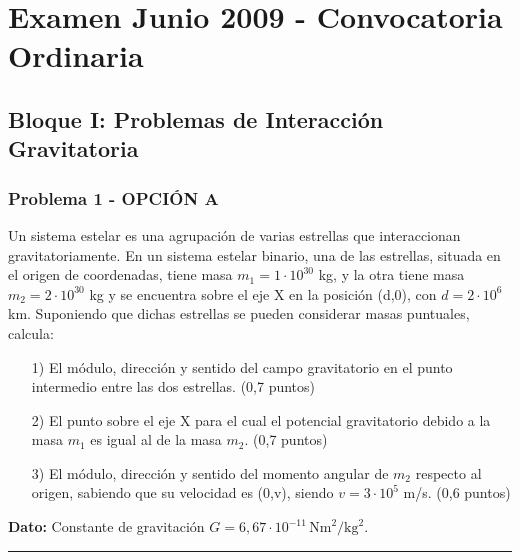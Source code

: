 \chapter{Examen Junio 2009 - Convocatoria Ordinaria}
\label{chap:2009_jun_ord}

\section{Bloque I: Problemas de Interacción Gravitatoria}
\label{sec:grav_2009_jun_ord}

\subsection{Problema 1 - OPCIÓN A}
\label{subsec:1A_2009_jun_ord}

\begin{cajaenunciado}
Un sistema estelar es una agrupación de varias estrellas que interaccionan gravitatoriamente. En un sistema estelar binario, una de las estrellas, situada en el origen de coordenadas, tiene masa $m_{1}=1\cdot10^{30}$ kg, y la otra tiene masa $m_{2}=2\cdot10^{30}$ kg y se encuentra sobre el eje X en la posición (d,0), con $d=2\cdot10^{6}$ km. Suponiendo que dichas estrellas se pueden considerar masas puntuales, calcula:
\begin{enumerate}
    \item[1)] El módulo, dirección y sentido del campo gravitatorio en el punto intermedio entre las dos estrellas. (0,7 puntos)
    \item[2)] El punto sobre el eje X para el cual el potencial gravitatorio debido a la masa $m_{1}$ es igual al de la masa $m_{2}$. (0,7 puntos)
    \item[3)] El módulo, dirección y sentido del momento angular de $m_{2}$ respecto al origen, sabiendo que su velocidad es (0,v), siendo $v=3\cdot10^{5}$ m/s. (0,6 puntos)
\end{enumerate}
\textbf{Dato:} Constante de gravitación $G=6,67\cdot10^{-11}\,\text{Nm}^2/\text{kg}^2$.
\end{cajaenunciado}
\hrule

